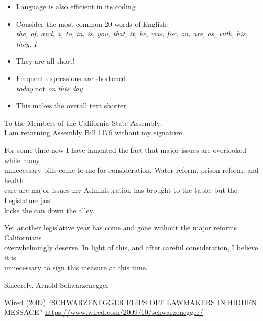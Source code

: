 \documentclass[a4paper,landscape,headrule,footrule,xetex]{foils}
\begin{document}

\begin{itemize}
\item Language is also efficient in its coding
\item Consider the most common 20 words of English:
\\ \textit{the, of, and, a, to, in, is, you, that, it, he, was, for, on, are, as, with, his, they, I}
\item They are all short!
\item Frequent expressions are shortened
\\ \textit{today} not \textit{on this day}
\item This makes the overall text shorter
\end{itemize}


\begin{flushleft}\small
  To the Members of the California State Assembly:\\ I am returning
  Assembly Bill 1176 without my signature.

  For some time now I have lamented the fact that major issues are overlooked while many \\
  unnecessary bills come to me for consideration. Water reform, prison
  reform, and health \\
  care are major issues my Administration has brought to the table, but the
  Legislature just \\
  kicks the can down the alley.

  Yet another legislative year has come and gone without the major
  reforms Californians  \\ overwhelmingly deserve. In light of this, and
  after careful consideration, I believe it is \\ unnecessary to sign
  this measure at this time.

  Sincerely, Arnold Schwarzenegger
\end{flushleft}
{\small
Wired (2009) ``SCHWARZENEGGER FLIPS OFF LAWMAKERS IN HIDDEN MESSAGE''
\url{https://www.wired.com/2009/10/schwarzenegger/}
}
\end{document}
